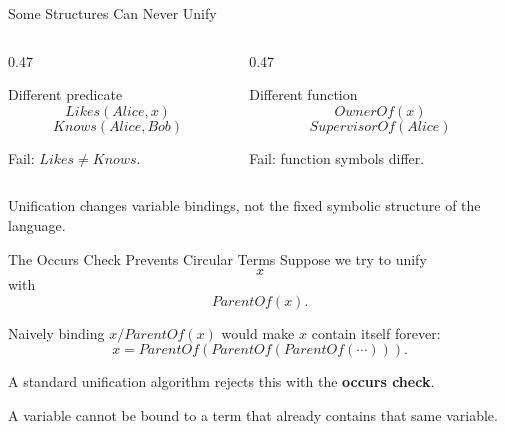 \documentclass[aspectratio=169,10pt]{beamer}
\begin{document}
\begin{frame}[shrink=10]{Some Structures Can Never Unify}
  \begin{columns}[T,onlytextwidth]
    \begin{column}{0.47\textwidth}
      \begin{block}{Different predicate}
        \[
          Likes(Alice,x)
        \]
        \[
          Knows(Alice,Bob)
        \]

        Fail: $Likes \neq Knows$.
      \end{block}
    \end{column}
    \begin{column}{0.47\textwidth}
      \begin{block}{Different function}
        \[
          OwnerOf(x)
        \]
        \[
          SupervisorOf(Alice)
        \]

        Fail: function symbols differ.
      \end{block}
    \end{column}
  \end{columns}

  \begin{keyidea}
    Unification changes variable bindings, not the fixed symbolic structure of the language.
  \end{keyidea}
\end{frame}

\begin{frame}[shrink=10]{The Occurs Check Prevents Circular Terms}
  Suppose we try to unify
  \[
    x
  \]
  with
  \[
    ParentOf(x).
  \]

  Naively binding $x/ParentOf(x)$ would make $x$ contain itself forever:
  \[
    x = ParentOf(ParentOf(ParentOf(\cdots))).
  \]

  A standard unification algorithm rejects this with the \textbf{occurs check}.

  \begin{keyidea}
    A variable cannot be bound to a term that already contains that same variable.
  \end{keyidea}
\end{frame}
\end{document}
